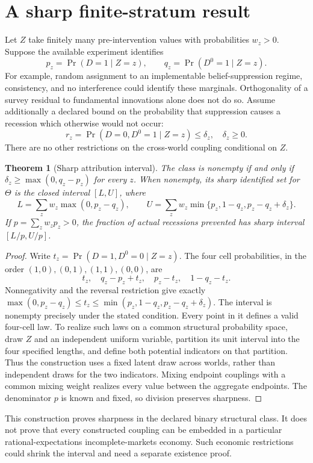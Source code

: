 \documentclass[11pt]{article}
\newtheorem{theorem}{Theorem}
\theoremstyle{definition}
\begin{document}
\section*{A sharp finite-stratum result}
Let $Z$ take finitely many pre-intervention values with probabilities
$w_z>0$. Suppose the available experiment identifies
\[
 p_z=\Pr(D=1\mid Z=z),\qquad q_z=\Pr(D^0=1\mid Z=z).
\]
For example, random assignment to an implementable belief-suppression regime,
consistency, and no interference could identify these marginals. Orthogonality
of a survey residual to fundamental innovations alone does not do so.
Assume additionally a declared bound on the probability that suppression
causes a recession which otherwise would not occur:
\[
 r_z=\Pr(D=0,D^0=1\mid Z=z)\le\delta_z,\quad\delta_z\ge0.
\]
There are no other restrictions on the cross-world coupling conditional on $Z$.
\begin{theorem}[Sharp attribution interval]
The class is nonempty if and only if
$\delta_z\ge\max(0,q_z-p_z)$ for every $z$. When nonempty, its sharp
identified set for $\Theta$ is the closed interval $[L,U]$, where
\[
 L=\sum_z w_z\max(0,p_z-q_z),\qquad
 U=\sum_z w_z\min\{p_z,1-q_z,p_z-q_z+\delta_z\}.
\]
If $p=\sum_z w_zp_z>0$, the fraction of actual recessions prevented has
sharp interval $[L/p,U/p]$.
\end{theorem}
\begin{proof}
Write $t_z=\Pr(D=1,D^0=0\mid Z=z)$. The four cell probabilities,
in the order $(1,0),(0,1),(1,1),(0,0)$, are
\[
 t_z,\quad q_z-p_z+t_z,\quad p_z-t_z,\quad1-q_z-t_z.
\]
Nonnegativity and the reversal restriction give exactly
$\max(0,p_z-q_z)\le t_z\le
\min(p_z,1-q_z,p_z-q_z+\delta_z)$. The interval is nonempty precisely
under the stated condition. Every point in it defines a valid four-cell law.
To realize such laws on a common structural probability space, draw $Z$ and
an independent uniform variable, partition its unit interval into the four
specified lengths, and define both potential indicators on that partition.
Thus the construction uses a fixed latent draw across worlds, rather than
independent draws for the two indicators. Mixing endpoint couplings with a
common mixing weight realizes every value between the aggregate endpoints.
The denominator $p$ is known and fixed, so division preserves sharpness.
\end{proof}

This construction proves sharpness in the declared binary structural class.
It does not prove that every constructed coupling can be embedded in a
particular rational-expectations incomplete-markets economy. Such economic
restrictions could shrink the interval and need a separate existence proof.
\end{document}

